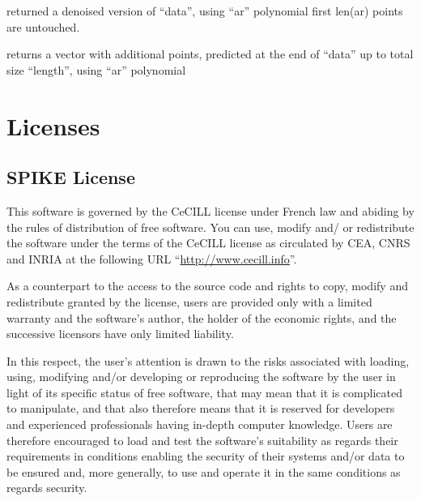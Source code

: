 \documentclass[letterpaper,10pt,openany,oneside]{sphinxmanual}
\begin{document}

\begin{fulllineitems}
\label{rst/code:Algo.Linpredic.denoise}
returned a denoised version of ``data'', using ``ar'' polynomial
first len(ar) points are untouched.

\end{fulllineitems}


\begin{fulllineitems}
\label{rst/code:Algo.Linpredic.predict}
returns a vector with additional points, predicted at the end of ``data'' up to total size ``length'', using ``ar'' polynomial

\end{fulllineitems}



\chapter{Licenses}
\label{rst/licenses:licenses}\label{rst/licenses::doc}

\section{SPIKE License}
\label{rst/licenses:spike-license}
This software is governed by the CeCILL  license under French law and
abiding by the rules of distribution of free software.  You can  use,
modify and/ or redistribute the software under the terms of the CeCILL
license as circulated by CEA, CNRS and INRIA at the following URL
``\href{http://www.cecill.info}{http://www.cecill.info}''.

As a counterpart to the access to the source code and  rights to copy,
modify and redistribute granted by the license, users are provided only
with a limited warranty  and the software's author,  the holder of the
economic rights,  and the successive licensors  have only  limited
liability.

In this respect, the user's attention is drawn to the risks associated
with loading,  using,  modifying and/or developing or reproducing the
software by the user in light of its specific status of free software,
that may mean  that it is complicated to manipulate,  and  that  also
therefore means  that it is reserved for developers  and  experienced
professionals having in-depth computer knowledge. Users are therefore
encouraged to load and test the software's suitability as regards their
requirements in conditions enabling the security of their systems and/or
data to be ensured and,  more generally, to use and operate it in the
same conditions as regards security.
\end{document}
